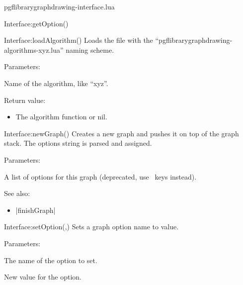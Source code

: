\begin{filedescription}{pgflibrarygraphdrawing-interface.lua}
\begin{luacommand}{{Interface:getOption}()}
\end{luacommand}\begin{luacommand}{{Interface:loadAlgorithm}()}
Loads the file with the ``pgflibrarygraphdrawing-algorithms-xyz.lua'' naming scheme.

Parameters:
\begin{parameterdescription}
	\item[\meta{name}] Name of  the algorithm, like ``xyz''.
\end{parameterdescription}


Return value:
\begin{itemize} \item[] The algorithm function or nil. \end{itemize}


\end{luacommand}\begin{luacommand}{{Interface:newGraph}()}
Creates a new graph and pushes it on top of the graph stack.  The options string is parsed and assigned.

Parameters:
\begin{parameterdescription}
	\item[\meta{options}] A list of options for this graph (deprecated, use \tikzname\ keys instead).
\end{parameterdescription}



See also:
\begin{itemize}
	\item[] |finishGraph|
\end{itemize}

\end{luacommand}\begin{luacommand}{{Interface:setOption}(,)}
Sets a graph option name to value.

Parameters:
\begin{parameterdescription}
	\item[\meta{name}] The name of the option to set.\item[\meta{value}] New value for the option.
\end{parameterdescription}



\end{luacommand}
\end{filedescription}